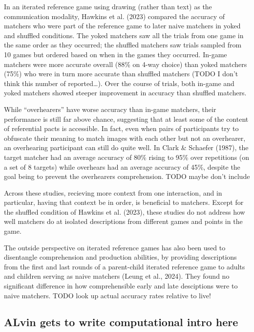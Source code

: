 \documentclass[10pt, letterpaper]{article}
\begin{document}
In an iterated reference game using drawing (rather than text) as the
communication modality, Hawkins et al. (2023) compared the accuracy of
matchers who were part of the reference game to later naive matchers in
yoked and shuffled conditions. The yoked matchers saw all the trials
from one game in the same order as they occurred; the shuffled matchers
saw trials sampled from 10 games but ordered based on when in the games
they occurred. In-game matchers were more accurate overall (88\% on
4-way choice) than yoked matchers (75\%) who were in turn more accurate
than shuffled matchers (TODO I don't think this number of
reported\ldots). Over the course of trials, both in-game and yoked
matchers showed steeper improvement in accuracy than shuffled matchers.

While ``overhearers'' have worse accuracy than in-game matchers, their
performance is still far above chance, suggesting that at least some of
the content of referential pacts is accessible. In fact, even when pairs
of participants try to obfuscate their meaning to match images with each
other but not an overhearer, an overhearing participant can still do
quite well. In Clark \& Schaefer (1987), the target matcher had an
average accuracy of 80\% rising to 95\% over repetitions (on a set of 8
targets) while overhears had an average accuracy of 45\%, despite the
goal being to prevent the overhearers comprehension. TODO maybe don't
include

Across these studies, recieving more context from one interaction, and
in particular, having that context be in order, is beneficial to
matchers. Except for the shuffled condition of Hawkins et al. (2023),
these studies do not address how well matchers do at isolated
descriptions from different games and points in the game.

The outside perspective on iterated reference games has also been used
to disentangle comprehension and production abilities, by providing
descriptions from the first and last rounds of a parent-child iterated
reference game to adults and children serving as naive matchers (Leung
et al., 2024). They found no significant difference in how
comprehensible early and late desciptions were to naive matchers. TODO
look up actual accuracy rates relative to live!

\subsection{ALvin gets to write computational intro
here}\label{alvin-gets-to-write-computational-intro-here}
\end{document}
